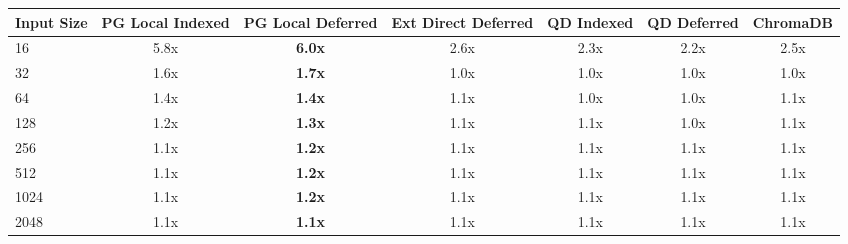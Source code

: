 \begin{tabular}{lcccccc}
\toprule
\textbf{Input Size} & \textbf{PG Local Indexed} & \textbf{PG Local Deferred} & \textbf{Ext Direct Deferred} & \textbf{QD Indexed} & \textbf{QD Deferred} & \textbf{ChromaDB} \\
\midrule
16 & 5.8x & \textbf{6.0x} & 2.6x & 2.3x & 2.2x & 2.5x \\
32 & 1.6x & \textbf{1.7x} & 1.0x & 1.0x & 1.0x & 1.0x \\
64 & 1.4x & \textbf{1.4x} & 1.1x & 1.0x & 1.0x & 1.1x \\
128 & 1.2x & \textbf{1.3x} & 1.1x & 1.1x & 1.0x & 1.1x \\
256 & 1.1x & \textbf{1.2x} & 1.1x & 1.1x & 1.1x & 1.1x \\
512 & 1.1x & \textbf{1.2x} & 1.1x & 1.1x & 1.1x & 1.1x \\
1024 & 1.1x & \textbf{1.2x} & 1.1x & 1.1x & 1.1x & 1.1x \\
2048 & 1.1x & \textbf{1.1x} & 1.1x & 1.1x & 1.1x & 1.1x \\
\bottomrule
\end{tabular}
